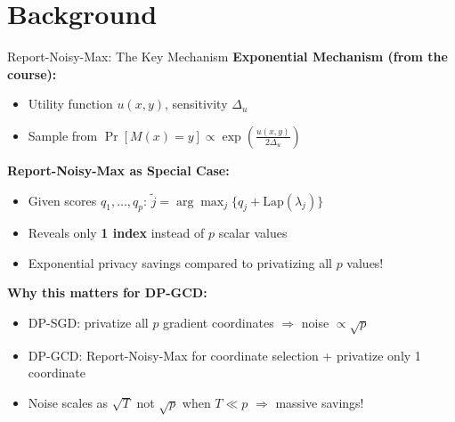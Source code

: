 \documentclass{beamer}
\begin{document}
\section{Background}

\begin{frame}{Report-Noisy-Max: The Key Mechanism}
\textbf{Exponential Mechanism (from the course):}
\begin{itemize}
\item Utility function $u(x, y)$, sensitivity $\Delta_u$
\item Sample from $\Pr[M(x) = y] \propto \exp\left( \frac{u(x,y)}{2\Delta_u} \right)$
\end{itemize}

\vspace{0.8em}

\textbf{Report-Noisy-Max as Special Case:}
\begin{itemize}
\item Given scores $q_1, \ldots, q_p$: $\tilde{j} = \arg\max_j \{ q_j + \mathrm{Lap}(\lambda_j) \}$
\item Reveals only \textbf{1 index} instead of $p$ scalar values
\item \alert{Exponential privacy savings} compared to privatizing all $p$ values!
\end{itemize}

\vspace{0.8em}

\textbf{Why this matters for DP-GCD:}
\begin{itemize}
\item DP-SGD: privatize all $p$ gradient coordinates $\Rightarrow$ noise $\propto \sqrt{p}$
\item DP-GCD: Report-Noisy-Max for coordinate selection + privatize only 1 coordinate
\item Noise scales as $\sqrt{T}$ not $\sqrt{p}$ when $T \ll p$ $\Rightarrow$ massive savings!
\end{itemize}
\end{frame}
\end{document}
